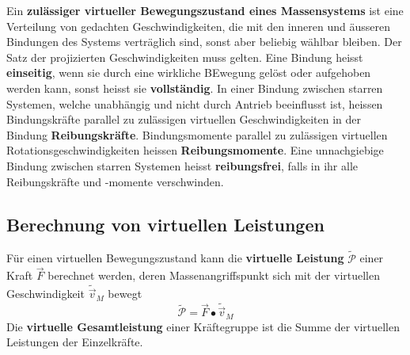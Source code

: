\newline\newline
Ein \textbf{zulässiger virtueller Bewegungszustand eines Massensystems} ist eine Verteilung von gedachten Geschwindigkeiten, die mit den inneren und äusseren Bindungen des Systems verträglich sind, sonst aber beliebig wählbar bleiben. Der Satz der projizierten Geschwindigkeiten muss gelten.
\newline\newline
Eine Bindung heisst \textbf{einseitig}, wenn sie durch eine wirkliche BEwegung gelöst oder aufgehoben werden kann, sonst heisst sie \textbf{vollständig}.
\newline\newline
In einer Bindung zwischen starren Systemen, welche unabhängig und nicht durch Antrieb beeinflusst ist, heissen Bindungskräfte parallel zu zulässigen virtuellen Geschwindigkeiten in der Bindung \textbf{Reibungskräfte}. Bindungsmomente parallel zu zulässigen virtuellen Rotationsgeschwindigkeiten heissen \textbf{Reibungsmomente}. Eine unnachgiebige Bindung zwischen starren Systemen heisst \textbf{reibungsfrei}, falls in ihr alle Reibungskräfte und -momente verschwinden.
\subsection{Berechnung von virtuellen Leistungen}
Für einen virtuellen Bewegungszustand kann die \textbf{virtuelle Leistung} $\tilde{\mathcal{P}}$ einer Kraft $\overrightarrow{F}$ berechnet werden, deren Massenangriffspunkt sich mit der virtuellen Geschwindigkeit $\tilde{\overrightarrow{v}}_M$ bewegt
\begin{equation}
\boxed{\tilde{\mathcal{P}}=\overrightarrow{F}\bullet \tilde{\overrightarrow{v}}_M}
\end{equation}
Die \textbf{virtuelle Gesamtleistung} einer Kräftegruppe ist die Summe der virtuellen Leistungen der Einzelkräfte.
